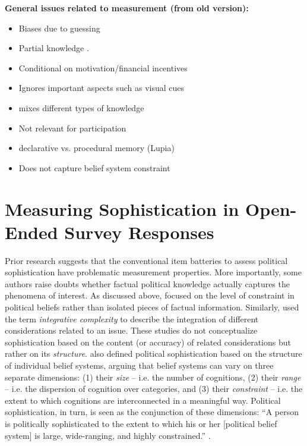 \documentclass[12pt]{article}
\begin{document}
\noindent \textbf{General issues related to measurement (from old version):}
\begin{itemize}\singlespacing
   \item Biases due to guessing \citep[e.g.][]{mondak2004knowledge}
   \item Partial knowledge \citep[e.g.][]{debell2013harder}.
   \item Conditional on motivation/financial incentives \citep[e.g.][]{prior2008money}
   \item Ignores important aspects such as visual cues \citep{prior2014visual}
   \item mixes different types of knowledge \citep{barabas2014question}
   \item Not relevant for participation \citep{lupia2006elitism}
   \item declarative vs. procedural memory (Lupia)
   \item Does not capture belief system constraint \citep{luskin1987measuring,tetlock1983cognitive}
\end{itemize}



\section*{Measuring Sophistication in Open-Ended Survey Responses}

Prior research suggests that the conventional item batteries to assess political sophistication have problematic measurement properties. More importantly, some authors raise doubts whether factual political knowledge actually captures the phenomena of interest. As discussed above, \citet{converse1964nature} focused on the level of constraint in political beliefs rather than isolated pieces of factual information. Similarly, \citet{tetlock1983cognitive} used the term \textsl{integrative complexity} to describe the integration of different considerations related to an issue. These studies do not conceptualize sophistication based on the content (or accuracy) of related considerations but rather on its \textsl{structure}. \citet{luskin1987measuring} also defined political sophistication based on the structure of individual belief systems, arguing that belief systems can vary on three separate dimensions: (1) their \textsl{size} -- i.e. the number of cognitions, (2) their \textsl{range} -- i.e. the dispersion of cognition over categories, and (3) their \textsl{constraint} -- i.e. the extent to which cognitions are interconnected in a meaningful way. Political sophistication, in turn, is seen as the conjunction of these dimensions: ``A person is politically sophisticated to the extent to which his or her [political belief system] is large, wide-ranging, and highly constrained.'' \citep[860]{luskin1987measuring}.
\end{document}
